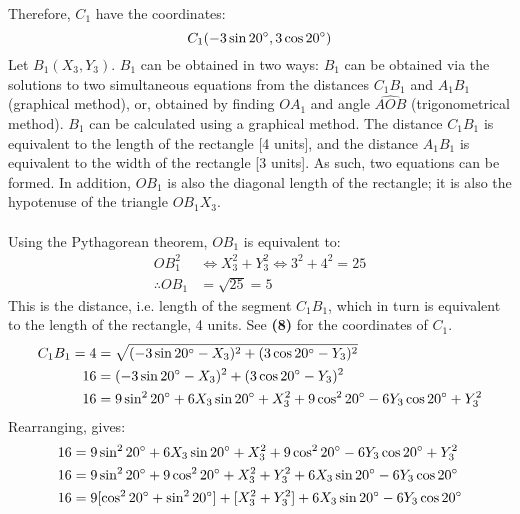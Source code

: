 \documentclass{article}
\begin{document}
        Therefore, $C_1$ have the coordinates:
        \begin{equation}
            C_1(-3\sin{20\degree}, 3\cos{20\degree})
        \end{equation}
        Let $B_1(X_3, Y_3)$. $B_1$ can be obtained in two ways: $B_1$ can be obtained via the solutions to two simultaneous equations from the distances $C_1B_1$ and $A_1B_1$ (graphical method), or, obtained by finding $OA_1$ and angle $\widehat{AOB}$ (trigonometrical method). \newpage\newpage
        $B_1$ can be calculated using a graphical method. The distance $C_1B_1$ is equivalent to the length of the rectangle [4 units], and the distance $A_1B_1$ is equivalent to the width of the rectangle [3 units]. As such, two equations can be formed. In addition, $OB_1$ is also the diagonal length of the rectangle; it is also the hypotenuse of the triangle $OB_1X_3$. \\\\
        Using the Pythagorean theorem, $OB_1$ is equivalent to:
        \begin{align*}
            OB_1^2 &\Leftrightarrow X_3^2 + Y_3^2 \Leftrightarrow 3^2 + 4^2 = 25 \\
            \therefore OB_1 &= \sqrt{25} = 5
        \end{align*}
            This is the distance, i.e. length of the segment $C_1B_1$, which in turn is equivalent to the length of the rectangle, 4 units. See \textbf{(8)} for the coordinates of $C_1$.
            \begin{align*}
                C_1B_1 = 4 &= \sqrt{(-3\sin{20\degree} - X_3)^2 + (3\cos{20\degree} - Y_3)^2} \\
                16 &= (-3\sin{20\degree} - X_3)^2 + (3\cos{20\degree} - Y_3)^2 \\
                16 &= 9\sin^2{20\degree} + 6X_3\sin{20\degree} + X_3^2 + 9\cos^2{20\degree} - 6Y_3\cos{20\degree} + Y_3^2
            \end{align*}
            Rearranging, gives:
            \begin{align*}
                16 &= 9\sin^2{20\degree} + 6X_3\sin{20\degree} + X_3^2 + 9\cos^2{20\degree} - 6Y_3\cos{20\degree} + Y_3^2 \\
                16 &= 9\sin^2{20\degree} + 9\cos^2{20\degree} + X_3^2 + Y_3^2 + 6X_3\sin{20\degree} - 6Y_3\cos{20\degree} \\
                16 &= 9[\cos^2{20\degree} + \sin^2{20\degree}] + [X_3^2 + Y_3^2] + 6X_3\sin{20\degree} - 6Y_3\cos{20\degree}
            \end{align*}
\end{document}
